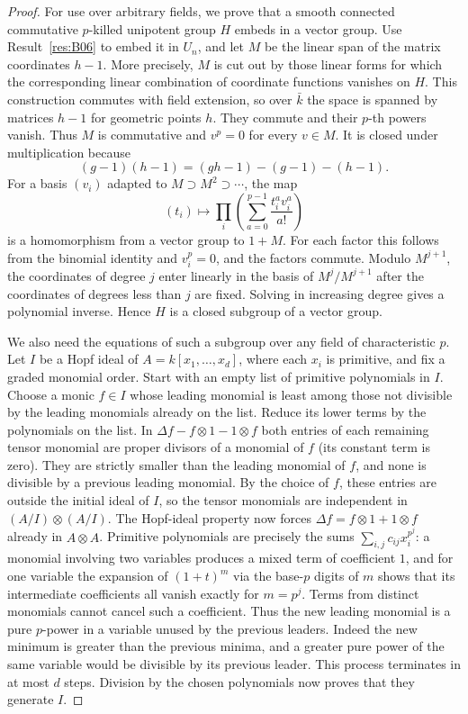 \documentclass[11pt,a4paper,openany,oneside]{book}
\theoremstyle{resultstyle}
\theoremstyle{definition}
\numberwithin{equation}{chapter}
\begin{document}
\begin{proof}
For use over arbitrary fields, we prove that a smooth connected
commutative \(p\)-killed unipotent group \(H\) embeds in a vector
group. Use Result~\ref{res:B06} to embed it in \(U_n\), and let \(M\)
be the linear span of the matrix coordinates \(h-1\). More
precisely, \(M\) is cut out by those linear forms for which the
corresponding linear combination of coordinate functions vanishes
on \(H\). This construction commutes with field extension, so
over \(\bar k\) the space is spanned by matrices \(h-1\) for
geometric points \(h\). They commute and their \(p\)-th powers
vanish. Thus \(M\) is commutative and \(v^p=0\) for every \(v\in M\).
It is closed under multiplication because
\[
  (g-1)(h-1)=(gh-1)-(g-1)-(h-1).
\]
For a basis \((v_i)\) adapted to \(M\supset M^2\supset\cdots\), the
map
\[
 (t_i)\longmapsto
      \prod_i\left(\sum_{a=0}^{p-1}\frac{t_i^av_i^a}{a!}\right)
\]
is a homomorphism from a vector group to \(1+M\). For each factor
this follows from the binomial identity and \(v_i^p=0\), and the
factors commute. Modulo \(M^{j+1}\), the coordinates of degree
\(j\) enter linearly in the basis of \(M^j/M^{j+1}\) after the
coordinates of degrees less than \(j\) are fixed. Solving in
increasing degree gives a polynomial inverse. Hence \(H\) is a
closed subgroup of a vector group.

We also need the equations of such a subgroup over any field of
characteristic \(p\). Let \(I\) be a Hopf ideal of
\(A=k[x_1,\ldots,x_d]\), where each \(x_i\) is primitive, and fix
a graded monomial order. Start with an empty list of primitive
polynomials in \(I\). Choose a monic \(f\in I\) whose leading
monomial is least among those not divisible by the leading
monomials already on the list. Reduce its lower terms by the
polynomials on the list. In
\(\Delta f-f\otimes1-1\otimes f\) both entries of each remaining
tensor monomial are proper divisors of a monomial of \(f\) (its
constant term is zero). They are strictly smaller than the leading
monomial of \(f\), and none is divisible by a previous leading
monomial. By the choice of \(f\), these entries are outside the
initial ideal of \(I\), so the tensor monomials are independent in
\((A/I)\otimes(A/I)\). The Hopf-ideal property now forces
\(\Delta f=f\otimes1+1\otimes f\) already in \(A\otimes A\).
Primitive polynomials are precisely the sums
\(\sum_{i,j}c_{ij}x_i^{p^j}\): a monomial involving two variables
produces a mixed term of coefficient \(1\), and for one variable
the expansion of \((1+t)^m\) via the base-\(p\) digits of \(m\)
shows that its intermediate coefficients all vanish exactly for
\(m=p^j\). Terms from distinct monomials cannot cancel such a
coefficient. Thus the new leading monomial is a pure \(p\)-power
in a variable unused by the previous leaders. Indeed the new
minimum is greater than the previous minima, and a greater pure
power of the same variable would be divisible by its previous
leader. This process terminates in at most \(d\) steps. Division
by the chosen polynomials now proves that they generate \(I\).


\end{proof}
\end{document}
